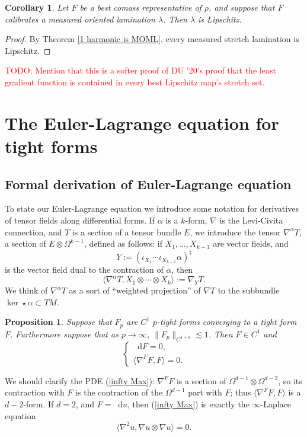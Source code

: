 \documentclass[reqno,11pt]{amsart}
\newcommand*\dif{\mathop{}\!\mathrm{d}}
\newtheorem{proposition}[theorem]{Proposition}
\newtheorem{corollary}[theorem]{Corollary}
\theoremstyle{definition}
\numberwithin{equation}{section}
\newcommand\todo[1]{\textcolor{red}{TODO: #1}}
\begin{document}
\begin{corollary}
Let $F$ be a best comass representative of $\rho$, and suppose that $F$ calibrates a measured oriented lamination $\lambda$.
Then $\lambda$ is Lipschitz.
\end{corollary}
\begin{proof}
By Theorem \ref{1 harmonic is MOML}, every measured stretch lamination is Lipschitz.
\end{proof}

\todo{Mention that this is a softer proof of DU '20's proof that the least gradient function is contained in every best Lipschitz map's stretch set.}

\section{The Euler-Lagrange equation for tight forms}\label{infinityMax}
\subsection{Formal derivation of Euler-Lagrange equation}
To state our Euler-Lagrange equation we introduce some notation for derivatives of tensor fields along differential forms.
If $\alpha$ is a $k$-form, $\nabla$ is the Levi-Civita connection, and $T$ is a section of a tensor bundle $E$, we introduce the tensor $\nabla^\alpha T$, a section of $E \otimes \Omega^{k - 1}$, defined as follows: if $X_1, \dots, X_{k - 1}$ are vector fields, and
$$Y := (\iota_{X_1} \cdots \iota_{X_{k - 1}} \alpha)^\sharp$$
is the vector field dual to the contraction of $\alpha$, then
$$\langle \nabla^\alpha T, X_1 \otimes \cdots \otimes X_k\rangle := \nabla_Y T.$$
We think of $\nabla^\alpha T$ as a sort of ``weighted projection'' of $\nabla T$ to the subbundle $\ker \star \alpha \subset TM$.

\begin{proposition}
Suppose that $F_p$ are $C^1$ $p$-tight forms converging to a tight form $F$.
Furthermore suppose that as $p \to \infty$, $\|F_p\|_{C^{1 + \alpha}} \lesssim 1$.
Then $F \in C^1$ and 
\begin{equation}\label{infty Max}
\begin{cases}
\dif F = 0, \\
\langle \nabla^F F, F\rangle = 0.
\end{cases}
\end{equation}
\end{proposition}

We should clarify the PDE (\ref{infty Max}): $\nabla^F F$ is a section of $\Omega^{d - 1} \otimes \Omega^{d - 2}$, so its contraction with $F$ is the contraction of the $\Omega^{d - 1}$ part with $F$; thus $\langle \nabla^F F, F\rangle$ is a $d - 2$-form.
If $d = 2$, and $F = \dif u$, then (\ref{infty Max}) is exactly the $\infty$-Laplace equation 
$$\langle\nabla^2 u, \nabla u \otimes \nabla u\rangle = 0.$$
\end{document}
